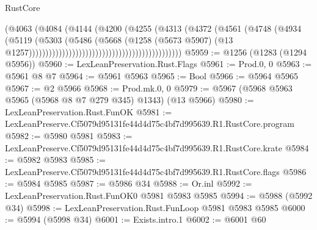 \begin{lexlean}{RustCore}
\begin{coremodule}
                                                                (@4063
                                                                  (@4084
                                                                    (@4144
                                                                      (@4200
                                                                        (@4255
                                                                          (@4313
                                                                            (@4372
                                                                              (@4561
                                                                                (@4748
                                                                                  (@4934
                                                                                    (@5119
                                                                                      (@5303
                                                                                        (@5486
                                                                                          (@5668
                                                                                            (@1258
                                                                                              (@5673
                                                                                                @5907)
                                                                                              (@13
                                                                                                @1257))))))))))))))))))))))))))))))))))))))))))))))
@5959 := @1256 (@1283 (@1294 @5956))
@5960 := LexLeanPreservation.Rust.Flags
@5961 := Prod.{0, 0}
@5963 := @5961 @8 @7
@5964 := @5961 @5963
@5965 := Bool
@5966 := @5964 @5965
@5967 := @2 @5966
@5968 := Prod.mk.{0, 0}
@5979 := @5967 (@5968 @5963 @5965 (@5968 @8 @7 @279 @345) @1343) (@13 @5966)
@5980 := LexLeanPreservation.Rust.FunOK
@5981 := LexLeanPreserve.Cf5079d95131fe44d4d75c4bf7d995639.R1.RustCore.program
@5982 := @5980 @5981
@5983 := LexLeanPreserve.Cf5079d95131fe44d4d75c4bf7d995639.R1.RustCore.krate
@5984 := @5982 @5983
@5985 := LexLeanPreserve.Cf5079d95131fe44d4d75c4bf7d995639.R1.RustCore.flags
@5986 := @5984 @5985
@5987 := @5986 @34
@5988 := Or.inl
@5992 := LexLeanPreservation.Rust.FunOK0 @5981 @5983 @5985
@5994 := @5988 (@5992 @34)
@5998 := LexLeanPreservation.Rust.FunLoop @5981 @5983 @5985
@6000 := @5994 (@5998 @34)
@6001 := Exists.intro.{1}
@6002 := @6001 @60

\end{coremodule}
\end{lexlean}
